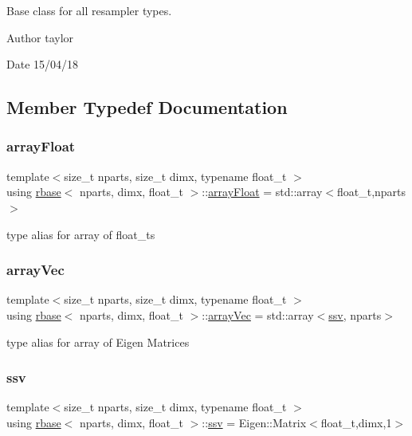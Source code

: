 Base class for all resampler types. 

\begin{DoxyAuthor}{Author}
taylor 
\end{DoxyAuthor}
\begin{DoxyDate}{Date}
15/04/18 
\end{DoxyDate}


\subsection{Member Typedef Documentation}
\mbox{\label{classrbase_a6f76bef853e508cb5b6f546d231b06f5}} 
\subsubsection{\texorpdfstring{array\+Float}{arrayFloat}}
{\footnotesize\ttfamily template$<$size\+\_\+t nparts, size\+\_\+t dimx, typename float\+\_\+t $>$ \\
using \hyperlink{classrbase}{rbase}$<$ nparts, dimx, float\+\_\+t $>$\+::\hyperlink{classrbase_a6f76bef853e508cb5b6f546d231b06f5}{array\+Float} =  std\+::array$<$float\+\_\+t,nparts$>$}

type alias for array of float\+\_\+ts \mbox{\label{classrbase_aa12fc826befa6ba0647b5f59ebc396ee}} 
\subsubsection{\texorpdfstring{array\+Vec}{arrayVec}}
{\footnotesize\ttfamily template$<$size\+\_\+t nparts, size\+\_\+t dimx, typename float\+\_\+t $>$ \\
using \hyperlink{classrbase}{rbase}$<$ nparts, dimx, float\+\_\+t $>$\+::\hyperlink{classrbase_aa12fc826befa6ba0647b5f59ebc396ee}{array\+Vec} =  std\+::array$<$\hyperlink{classrbase_ae20e0b8df15aa109252f57ecbf1f20f8}{ssv}, nparts$>$}

type alias for array of Eigen Matrices \mbox{\label{classrbase_ae20e0b8df15aa109252f57ecbf1f20f8}} 
\subsubsection{\texorpdfstring{ssv}{ssv}}
{\footnotesize\ttfamily template$<$size\+\_\+t nparts, size\+\_\+t dimx, typename float\+\_\+t $>$ \\
using \hyperlink{classrbase}{rbase}$<$ nparts, dimx, float\+\_\+t $>$\+::\hyperlink{classrbase_ae20e0b8df15aa109252f57ecbf1f20f8}{ssv} =  Eigen\+::\+Matrix$<$float\+\_\+t,dimx,1$>$}

